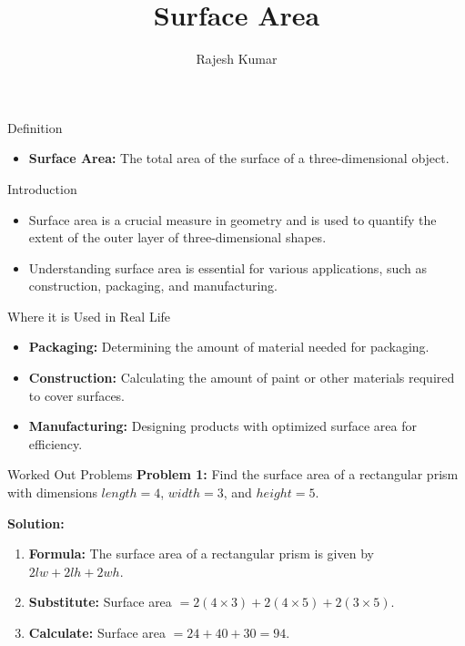 \title{Surface Area}
\author{Rajesh Kumar}
\date{}

\begin{frame}
  \titlepage
\end{frame}

\begin{frame}{Definition}
  \begin{itemize}
    \item \textbf{Surface Area:} The total area of the surface of a three-dimensional object.
  \end{itemize}
\end{frame}

\begin{frame}{Introduction}
  \begin{itemize}
    \item Surface area is a crucial measure in geometry and is used to quantify the extent of the outer layer of three-dimensional shapes.
    \item Understanding surface area is essential for various applications, such as construction, packaging, and manufacturing.
  \end{itemize}
\end{frame}

\begin{frame}{Where it is Used in Real Life}
  \begin{itemize}
    \item \textbf{Packaging:} Determining the amount of material needed for packaging.
    \item \textbf{Construction:} Calculating the amount of paint or other materials required to cover surfaces.
    \item \textbf{Manufacturing:} Designing products with optimized surface area for efficiency.
  \end{itemize}
\end{frame}

\begin{frame}{Worked Out Problems}
  \textbf{Problem 1:} Find the surface area of a rectangular prism with dimensions $length = 4$, $width = 3$, and $height = 5$.

  \textbf{Solution:}
  \begin{enumerate}
    \item \textbf{Formula:} The surface area of a rectangular prism is given by $2lw + 2lh + 2wh$.
    \item \textbf{Substitute:} Surface area $= 2(4 \times 3) + 2(4 \times 5) + 2(3 \times 5)$.
    \item \textbf{Calculate:} Surface area $= 24 + 40 + 30 = 94$.
  \end{enumerate}
\end{frame}

